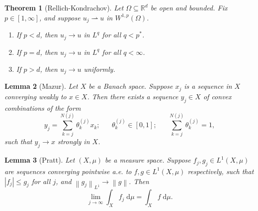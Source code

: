 \documentclass{book}
\newcommand{\bbR}{\mathbb{R}}
\renewcommand{\d}{\mathrm{d}}
\newcommand{\abs}[1]{\left\lvert {#1} \right\rvert}
\newcommand{\norm}[1]{\left\lVert {#1} \right\rVert}
\newcommand{\weak}{\rightharpoonup}
\newtheorem{theorem}{Theorem}[chapter]
\newtheorem{lemma}[theorem]{Lemma}
\theoremstyle{definition}
\numberwithin{equation}{chapter}
\begin{document}
\begin{theorem}[Rellich-Kondrachov] \label{thm:rellichKondrachov}
    Let $\Omega \subseteq \bbR^d$ be open and bounded. Fix $p \in [1,\infty]$, and suppose $u_j \weak u$ in $W^{1,p}(\Omega)$.
    \begin{enumerate}[label=(\roman*)]
        \item If $p < d$, then $u_j \rightarrow u$ in $L^q$ for all $q < p^*$.
        \item If $p = d$, then $u_j \rightarrow u$ in $L^q$ for all $q < \infty$.
        \item If $p > d$, then $u_j \rightarrow u$ uniformly.
    \end{enumerate}
\end{theorem}

\begin{lemma}[Mazur]
    Let $X$ be a Banach space. Suppose $x_j$ is a sequence in $X$ converging weakly to $x \in X$. Then there exists a sequence $y_j \in X$ of convex combinations of the form 
    \begin{equation}
        y_j = \sum_{k=j}^{N(j)} \theta^{(j)}_k x_k; \hspace{20pt} \theta^{(j)}_k \in [0,1]; \hspace{20pt} \sum_{k=j}^{N(j)} \theta^{(j)}_k = 1,
    \end{equation}
    such that $y_j \rightarrow x$ strongly in $X$.
\end{lemma}

\begin{lemma}[Pratt] \label{lem:pratt}
    Let $(X,\mu)$ be a measure space. Suppose $f_j,g_j \in L^1(X,\mu)$ are sequences converging pointwise a.e. to $f,g \in L^1(X,\mu)$ respectively, such that $\abs{f_j} \leq g_j$ for all $j$, and $\norm{g_j}_{L^1} \rightarrow \norm{g}$. Then 
    \begin{equation}
        \lim_{j \to \infty} \int_X f_j \; \d \mu = \int_X f \; \d \mu.
    \end{equation}
\end{lemma}
 
\end{document}
